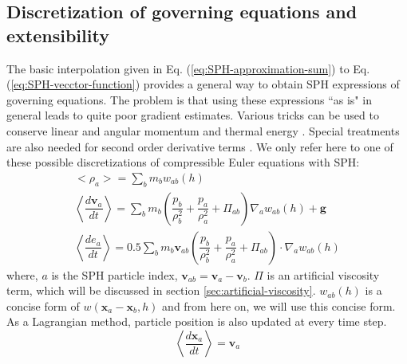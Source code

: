 \documentclass[journal abbreviation, manuscript]{copernicus}
\begin{document}
\subsection{Discretization of governing equations and extensibility}
The basic interpolation given in Eq. (\ref{eq:SPH-approximation-sum}) to Eq. (\ref{eq:SPH-vecctor-function}) provides a general way to obtain SPH expressions of governing equations. The problem is that using these expressions ``{as is}" in general leads to quite poor gradient estimates. Various tricks can be used to conserve linear and angular momentum and thermal energy \citep{monaghan1992smoothed}. Special treatments are also needed for second order derivative terms \citep{monaghan2005smoothed}. We only refer here to one of these possible discretizations of compressible Euler equations with SPH:
\begin{align}
<\rho_a> = \sum_b m_b w_{ab} \left(h\right) \label{eq:ns-sph-d} \\
\left\langle\dfrac{d \textbf{v}_a}{d t}\right\rangle = \sum_b m_b \left(\dfrac{p_b}{\rho_b^2} + \dfrac{p_a}{\rho_a^2} + \Pi_{ab}\right) \nabla_a w_{a b}\left(h\right) +\textbf{g} \label{eq:ns-sph-v} \\
\left\langle\dfrac{d e_a}{d t}\right\rangle=
 0.5\sum_b m_b \textbf{v}_{a b}\left(\dfrac{p_b}{\rho_b^2} + \dfrac{p_a}{\rho_a^2} + \Pi_{ab}\right) \cdot \nabla_a w_{a b}\left(h\right) \label{eq:ns-sph-e}
\end{align}
where, $a$ is the SPH particle index, $\textbf{v}_{a b} = \textbf{v}_a - \textbf{v}_b$. $\Pi$ is an artificial viscosity term, which will be discussed in section \ref{sec:artificial-viscosity}. $w_{a b}\left(h\right)$ is a concise form of $w\left(\textbf{x}_a - \textbf{x}_b, h\right)$ and from here on, we will use this concise form.
As a Lagrangian method, particle position is also updated at every time step.
\begin{equation}
\left\langle\dfrac{d \textbf{x}_a}{dt}\right\rangle = \textbf{v}_a \label{eq:SPH-update-pos}
\end{equation}
\end{document}
